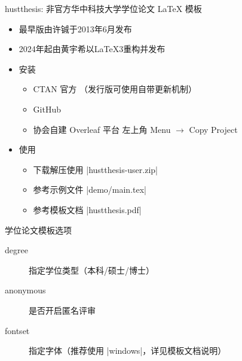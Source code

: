 \begin{frame}{hustthesis: 非官方华中科技大学学位论文 \LaTeX{} 模板}
  \begin{itemize}
  \item 最早\LaTeXe{}版由许铖于2013年6月发布
  \item 2024年起由黄宇希以\LaTeX3重构并发布\pause

  \item 安装
    \begin{itemize}
      \item CTAN 官方 （发行版可使用自带更新机制）
      \item GitHub \link[\faGithub\thesisgithubpath]{\thesisgithublink}
      \item 协会自建 Overleaf 平台 \link{\thesishlugoverleaf} 左上角 Menu $\rightarrow$ Copy Project
    \end{itemize} \pause

  \item 使用
    \begin{itemize}
      \item 下载解压使用 |hustthesis-user.zip| 
      \item 参考示例文件 |demo/main.tex| 
      \item 参考模板文档 |hustthesis.pdf| 
    \end{itemize}
  \end{itemize}
\end{frame}

\begin{frame}[fragile]{学位论文模板选项}
  \begin{description}
  \item[degree] 指定学位类型（本科/硕士/博士）
  \item[anonymous] 是否开启匿名评审
  \item[fontset] 指定字体（推荐使用 |windows|，详见模板文档说明）
  \end{description}
\end{frame}

